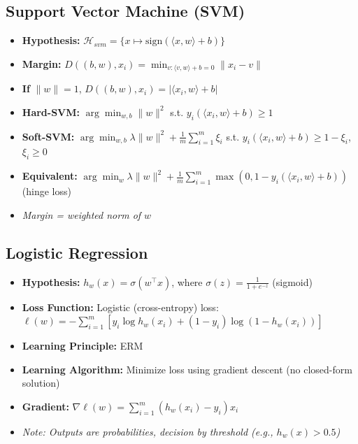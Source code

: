 \noindent
{}

\subsection{Support Vector Machine (SVM)}
\begin{itemize}
    \item \textbf{Hypothesis:} $\mathcal{H}_{\mathit{svm}} = \{x \mapsto \mathrm{sign}(\langle x, w \rangle + b)\}$
    \item \textbf{Margin:} $D((b, w), x_i) = \min_{v: \langle v, w \rangle + b = 0} \|x_i - v\|$
    \item \textbf{If} $\|w\| = 1$, $D((b, w), x_i) = |\langle x_i, w \rangle + b|$
    \item \textbf{Hard-SVM:} $\arg\min_{w, b} \|w\|^2$ s.t. $y_i (\langle x_i, w \rangle + b) \geq 1$
    \item \textbf{Soft-SVM:} $\arg\min_{w, b} \lambda \|w\|^2 + \frac{1}{m} \sum_{i=1}^m \xi_i$ s.t. $y_i (\langle x_i, w \rangle + b) \geq 1 - \xi_i$, $\xi_i \geq 0$
    \item \textbf{Equivalent:} $\arg\min_w \lambda \|w\|^2 + \frac{1}{m} \sum_{i=1}^m \max(0, 1 - y_i (\langle x_i, w \rangle + b))$ (hinge loss)
    \item[] \textit{Margin = weighted norm of $w$}
\end{itemize}

\subsection{Logistic Regression}
\begin{itemize}
    \item \textbf{Hypothesis:} $h_w(x) = \sigma(w^\top x)$, where $\sigma(z) = \frac{1}{1 + e^{-z}}$ (sigmoid)
    \item \textbf{Loss Function:} Logistic (cross-entropy) loss: $\ell(w) = -\sum_{i=1}^m [y_i \log h_w(x_i) + (1-y_i) \log(1-h_w(x_i))]$
    \item \textbf{Learning Principle:} ERM
    \item \textbf{Learning Algorithm:} Minimize loss using gradient descent (no closed-form solution)
    \item \textbf{Gradient:} $\nabla \ell(w) = \sum_{i=1}^m (h_w(x_i) - y_i)x_i$
    \item[] \textit{Note: Outputs are probabilities, decision by threshold (e.g., $h_w(x) > 0.5$)}
\end{itemize}

